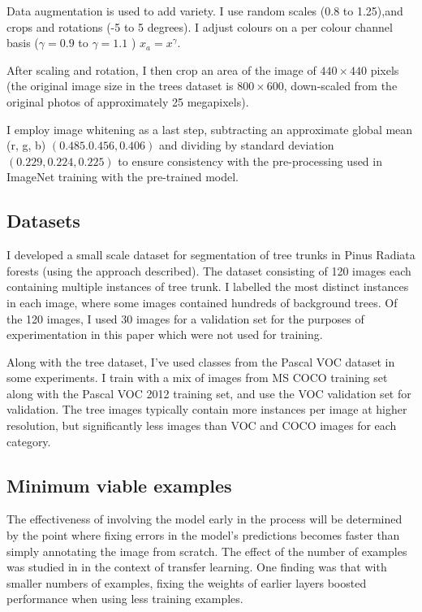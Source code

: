 Data augmentation is used to add variety. I use random scales (0.8 to 1.25),and crops and rotations (-5 to 5 degrees). I adjust colours on a per colour channel basis ($ \gamma = 0.9 $ to $ \gamma=1.1 $ )  $ x_a = x^{\gamma} $.

After scaling and rotation, I then crop an area of the image of $440 \times 440$ pixels (the original image size in the trees dataset is $800 \times 600$, down-scaled from the original photos of approximately 25 megapixels).

I employ image whitening as a last step, subtracting an approximate global mean (r, g, b) $ (0.485. 0.456, 0.406) $ and dividing by standard deviation $ (0.229, 0.224, 0.225) $  to ensure consistency with the pre-processing used in ImageNet training with the pre-trained model.



\subsection {Datasets}




I developed a small scale dataset for segmentation of tree trunks in Pinus Radiata forests (using the approach described). The dataset consisting of 120 images each containing multiple instances of tree trunk. I labelled the most distinct instances in each image, where some images contained hundreds of background trees. Of the 120 images, I used 30 images for a validation set for the purposes of experimentation in this paper which were not used for training.

Along with the tree dataset, I've used classes from the Pascal VOC dataset in some experiments. I train with a mix of images from MS COCO \cite{Lin2014} training set along with the Pascal VOC 2012 training set, and use the VOC validation set for validation. The tree images typically contain more instances per image at higher resolution, but significantly less images than VOC and COCO images for each category.


\subsection {Minimum viable examples}

The effectiveness of involving the model early in the process will be determined by the point where fixing errors in the model's predictions becomes faster than simply annotating the image from scratch. The effect of the number of examples was studied in \cite{Soekhoe} in the context of transfer learning. One finding was that with smaller numbers of examples, fixing the weights of earlier layers boosted performance when using less training examples.

